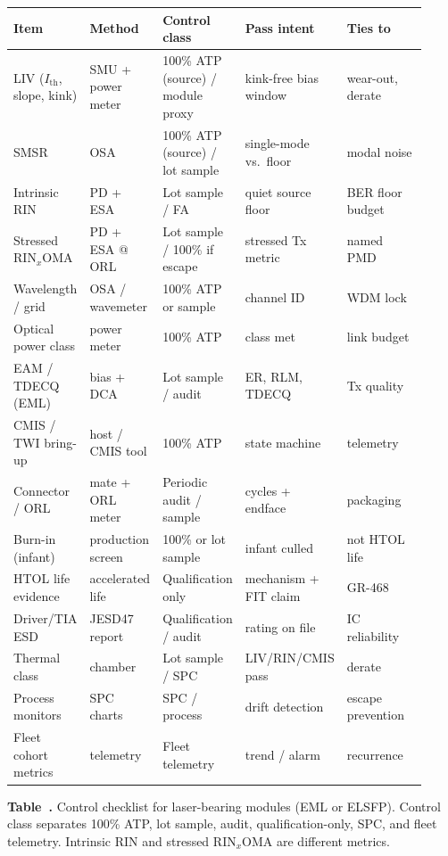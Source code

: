 \begin{table}[ht]
\label{tab:atp-laser}%
\centering
\setlength{\tabcolsep}{2.5pt}%
\footnotesize
\renewcommand{\arraystretch}{1.2}%
\begin{tabular}{@{}p{0.18\linewidth}p{0.16\linewidth}p{0.14\linewidth}p{0.22\linewidth}p{0.22\linewidth}@{}}
\toprule
Item & Method & Control class & Pass intent & Ties to \\
\midrule
LIV ($I_\mathrm{th}$, slope, kink) & SMU + power meter & 100\% ATP (source) / module proxy & kink-free bias window & wear-out, derate \\
\addlinespace[1.1em]
SMSR & OSA & 100\% ATP (source) / lot sample & single-mode vs.\ floor & modal noise \\
\addlinespace[1.1em]
Intrinsic RIN & PD + ESA & Lot sample / FA & quiet source floor & BER floor budget \\
\addlinespace[1.1em]
Stressed $\mathrm{RIN}_x\mathrm{OMA}$ & PD + ESA @ ORL & Lot sample / 100\% if escape & stressed Tx metric & named PMD \\
\addlinespace[1.1em]
Wavelength / grid & OSA / wavemeter & 100\% ATP or sample & channel ID & WDM lock \\
\addlinespace[1.1em]
Optical power class & power meter & 100\% ATP & class met & link budget \\
\addlinespace[1.1em]
EAM / TDECQ (EML) & bias + DCA & Lot sample / audit & ER, RLM, TDECQ & Tx quality \\
\addlinespace[1.1em]
CMIS / TWI bring-up & host / CMIS tool & 100\% ATP & state machine & telemetry \\
\addlinespace[1.1em]
Connector / ORL & mate + ORL meter & Periodic audit / sample & cycles + endface & packaging \\
\addlinespace[1.1em]
Burn-in (infant) & production screen & 100\% or lot sample & infant culled & not HTOL life \\
\addlinespace[1.1em]
HTOL life evidence & accelerated life & Qualification only & mechanism + FIT claim & GR-468 \\
\addlinespace[1.1em]
Driver/TIA ESD & JESD47 report & Qualification / audit & rating on file & IC reliability \\
\addlinespace[1.1em]
Thermal class & chamber & Lot sample / SPC & LIV/RIN/CMIS pass & derate \\
\addlinespace[1.1em]
Process monitors & SPC charts & SPC / process & drift detection & escape prevention \\
\addlinespace[1.1em]
Fleet cohort metrics & telemetry & Fleet telemetry & trend / alarm & recurrence \\
\bottomrule
\end{tabular}
\par\medskip
{\raggedright\footnotesize\textbf{Table~\thetable.} Control checklist for
laser-bearing modules (EML or ELSFP). Control class separates 100\% ATP, lot
sample, audit, qualification-only, SPC, and fleet telemetry. Intrinsic RIN and
stressed $\mathrm{RIN}_x\mathrm{OMA}$ are different metrics.\par}
\end{table}
\FloatBarrier

